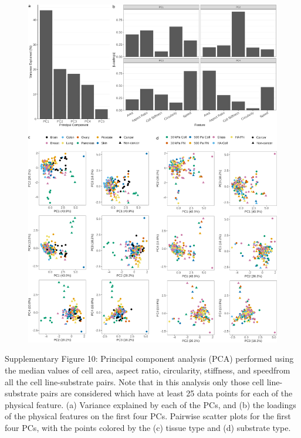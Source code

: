 \documentclass[11pt,letterpaper,english,oneside]{article} %
\begin{document}
\begin{figure}[H]
    \hspace*{-0.8cm}
    \vspace*{2cm}
    \centering
    \includegraphics{../Figures/Supplementary_Figure10/supplementary_figure10.png}
    \caption{}
    \label{fig:fig10}
\end{figure}
\begin{adjustwidth}{1cm}{1cm}
    Supplementary Figure 10: Principal component analysis (PCA) performed using the median values of cell area, aspect ratio, circularity, stiffness, and speedfrom all the cell line-substrate pairs.
    Note that in this analysis only those cell line-substrate pairs are considered which have at least 25 data points for each of the physical feature.
    (a) Variance explained by each of the PCs, and (b) the loadings of the physical features on the first four PCs.
    Pairwise scatter plots for the first four PCs, with the points colored by the (c) tissue type and (d) substrate type. 
\end{adjustwidth}
\end{document}
